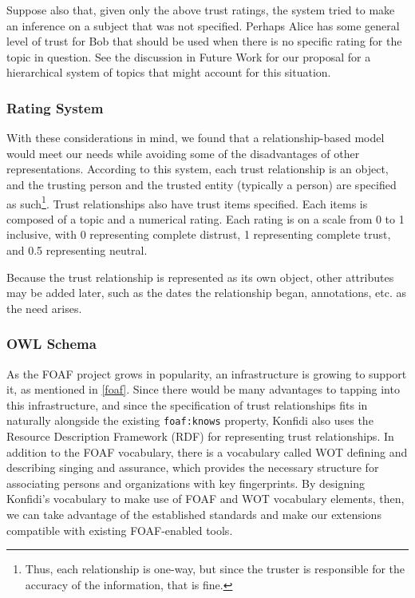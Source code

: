 \documentclass{acm_proc_article-sp}
\begin{document}
Suppose also that, given only the above trust ratings, the system tried to make an inference on a subject that was not specified.  Perhaps Alice has some general level of trust for Bob that should be used when there is no specific rating for the topic in question.  See the discussion in Future Work for our proposal for a hierarchical system of topics that might account for this situation.

\subsubsection{Rating System}
\label{rating}
With these considerations in mind, we found that a relationship-based model would meet our needs while avoiding some of the disadvantages of other representations.  According to this system, each trust relationship is an object, and the trusting person and the trusted entity (typically a person) are specified as such\footnote{Thus, each relationship is one-way, but since the truster is responsible for the accuracy of the information, that is fine.}.  Trust relationships also have trust items specified.  Each items is composed of a topic and a numerical rating.  Each rating is on a scale from 0 to 1 inclusive, with 0 representing complete distrust, 1 representing complete trust, and 0.5 representing neutral.

Because the trust relationship is represented as its own object, other attributes may be added later, such as the dates the relationship began, annotations, etc. as the need arises.

\subsubsection{OWL Schema}
As the FOAF project grows in popularity, an infrastructure is growing to support it, as mentioned in \ref{foaf}.  Since there would be many advantages to tapping into this infrastructure, and since the specification of trust relationships fits in naturally alongside the existing \texttt{foaf:knows} property, Konfidi also uses the Resource Description Framework (RDF)\cite{rdf} for representing trust relationships.  In addition to the FOAF vocabulary, there is a vocabulary called WOT defining and describing singing and assurance, which provides the necessary structure for associating persons and organizations with key fingerprints\cite{wot}.  By designing Konfidi's vocabulary to make use of FOAF and WOT vocabulary elements, then, we can take advantage of the established standards and make our extensions compatible with existing FOAF-enabled tools.
\end{document}
